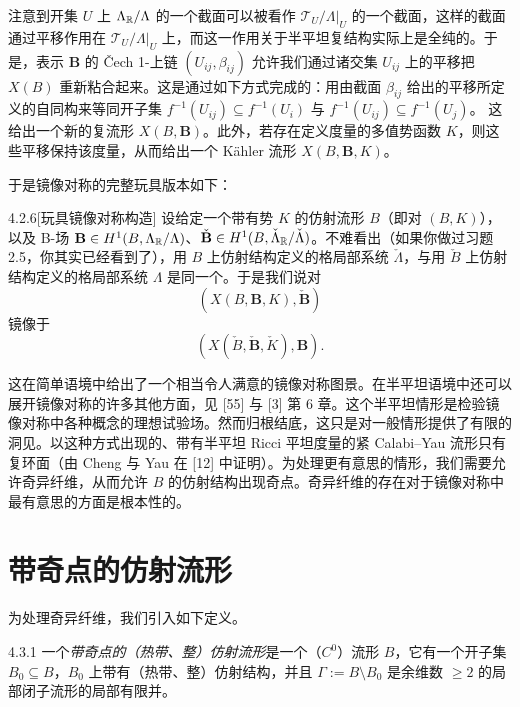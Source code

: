注意到开集 $U$ 上 $\Lambda_{\mathbb{R}}/\Lambda$ 的一个截面可以被看作 $\mathcal{T}_U/\Lambda|_U$ 的一个截面，这样的截面通过平移作用在 $\mathcal{T}_U/\Lambda|_U$ 上，而这一作用关于半平坦复结构实际上是全纯的。于是，表示 $\mathbf{B}$ 的 Čech 1-上链 $(U_{ij},\beta_{ij})$ 允许我们通过诸交集 $U_{ij}$ 上的平移把 $X(B)$ 重新粘合起来。这是通过如下方式完成的：用由截面 $\beta_{ij}$ 给出的平移所定义的自同构来等同开子集 $f^{-1}(U_{ij})\subseteq f^{-1}(U_i)$ 与 $f^{-1}(U_{ij})\subseteq f^{-1}(U_j)$。
这给出一个新的复流形 $X(B,\mathbf{B})$。此外，若存在定义度量的多值势函数 $K$，则这些平移保持该度量，从而给出一个 Kähler 流形 $X(B,\mathbf{B},K)$。

于是镜像对称的完整玩具版本如下：

\begin{construction}{4.2.6}[玩具镜像对称构造]
设给定一个带有势 $K$ 的仿射流形 $B$（即对 $(B,K)$），以及 B-场 $\mathbf{B}\in H^1(B,\Lambda_{\mathbb{R}}/\Lambda)$、$\check{\mathbf{B}}\in H^1(B,\check\Lambda_{\mathbb{R}}/\check\Lambda)$。不难看出（如果你做过习题 2.5，你其实已经看到了），用 $B$ 上仿射结构定义的格局部系统 $\check\Lambda$，与用 $\check B$ 上仿射结构定义的格局部系统 $\Lambda$ 是同一个。于是我们说对
\[
(X(B,\mathbf{B},K),\check{\mathbf{B}})
\]
镜像于
\[
(X(\check B,\check{\mathbf{B}},\check K),\mathbf{B}).
\]
\end{construction}

这在简单语境中给出了一个相当令人满意的镜像对称图景。在半平坦语境中还可以展开镜像对称的许多其他方面，见 [55] 与 [3] 第 6 章。这个半平坦情形是检验镜像对称中各种概念的理想试验场。然而归根结底，这只是对一般情形提供了有限的洞见。以这种方式出现的、带有半平坦 Ricci 平坦度量的紧 Calabi--Yau 流形只有复环面（由 Cheng 与 Yau 在 [12] 中证明）。为处理更有意思的情形，我们需要允许奇异纤维，从而允许 $B$ 的仿射结构出现奇点。奇异纤维的存在对于镜像对称中最有意思的方面是根本性的。

\section{带奇点的仿射流形}
为处理奇异纤维，我们引入如下定义。

\begin{definition}{4.3.1}
一个\emph{带奇点的（热带、整）仿射流形}是一个（$C^0$）流形 $B$，它有一个开子集 $B_0\subseteq B$，$B_0$ 上带有（热带、整）仿射结构，并且 $\Gamma:=B\setminus B_0$ 是余维数 $\ge2$ 的局部闭子流形的局部有限并。
\end{definition}

